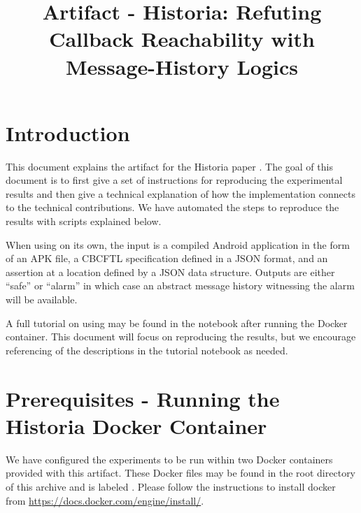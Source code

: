 \documentclass{acmart} %
\begin{document}

\newcommand{\newls}{CBCFTL\xspace}
%
\title{Artifact - Historia: Refuting Callback Reachability with Message-History Logics}

\begin{abstract}
\end{abstract}


\maketitle
%
\section{Introduction}
This document explains the artifact for the Historia paper \cite{conf/oopsla/Meier23}.
The goal of this document is to first give a set of instructions for reproducing the experimental results and then give a technical explanation of how the implementation connects to the technical contributions.
We have automated the steps to reproduce the results with scripts explained below.

When using \toolname on its own, the input is a compiled Android application in the form of an APK file, a \newls specification defined in a JSON format, and an assertion at a location defined by a JSON data structure.
Outputs are either ``safe'' or ``alarm'' in which case an abstract message history witnessing the alarm will be available.

A full tutorial on using \toolname may be found in the notebook  after running the Docker container.  
This document will focus on reproducing the results, but we encourage referencing of the descriptions in the tutorial notebook as needed.

\section{Prerequisites - Running the Historia Docker Container}

We have configured the experiments to be run within two Docker containers provided with this artifact.
These Docker files may be found in the root directory of this archive and is labeled .  Please follow the instructions to install docker from \url{https://docs.docker.com/engine/install/}.
\end{document}
